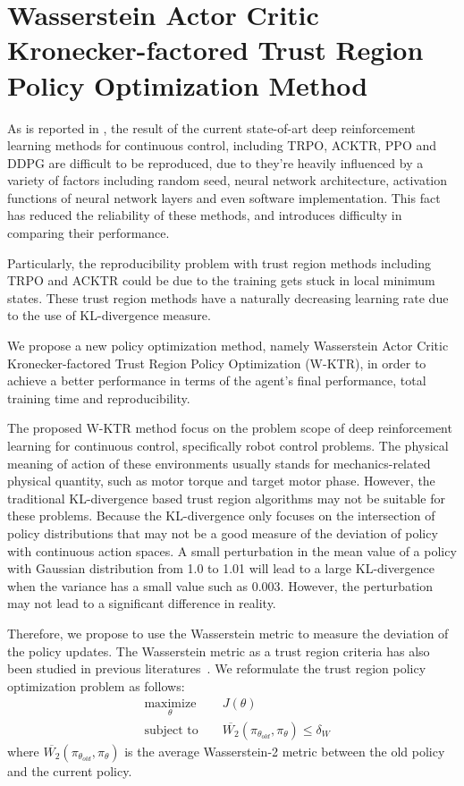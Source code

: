 \section{Wasserstein Actor Critic Kronecker-factored Trust Region Policy Optimization Method }
As is reported in \cite{henderson2017matters}, the result of the current state-of-art deep reinforcement learning methods for continuous control, including TRPO, ACKTR, PPO and DDPG are difficult to be reproduced, due to they're heavily influenced by a variety of factors including random seed, neural network architecture, activation functions of neural network layers and even software implementation. This fact has reduced the reliability of these methods, and introduces difficulty in comparing their performance.

Particularly, the reproducibility problem with trust region methods including TRPO and ACKTR could be due to the training gets stuck in local minimum states. These trust region methods have a naturally decreasing learning rate due to the use of KL-divergence measure. 

We propose a new policy optimization method, namely Wasserstein Actor Critic Kronecker-factored Trust Region Policy Optimization (W-KTR), in order to achieve a better performance in terms of the agent's final performance, total training time and reproducibility.

The proposed W-KTR method focus on the problem scope of deep reinforcement learning for continuous control, specifically robot control problems. The physical meaning of action of these environments usually stands for mechanics-related physical quantity, such as motor torque and target motor phase. However, the traditional KL-divergence based trust region algorithms may not be suitable for these problems. Because the KL-divergence only focuses on the intersection of policy distributions that may not be a good measure of the deviation of policy with continuous action spaces. A small perturbation in the mean value of a policy with Gaussian distribution from 1.0 to 1.01 will lead to a large KL-divergence when the variance has a small value such as 0.003. However, the perturbation may not lead to a significant difference in reality.

Therefore, we propose to use the Wasserstein metric to measure the deviation of the policy updates. The Wasserstein metric as a trust region criteria has also been studied in previous literatures~\cite{tolstikhin2017wasserstein}. We reformulate the trust region policy optimization problem as follows:
\begin{equation}
    \begin{aligned}
&    \underset{\theta}{\text{maximize}} 
&& J(\theta) \\
& \text{subject to } 
&& \overline{W_2}(\pi_{\theta_{old}},\pi_\theta) \leq \delta_{W}\end{aligned}
\end{equation}
where $ \overline{W_2}(\pi_{\theta_{old}},\pi_\theta)$ is the average Wasserstein-2 metric between the old policy and the current policy.

